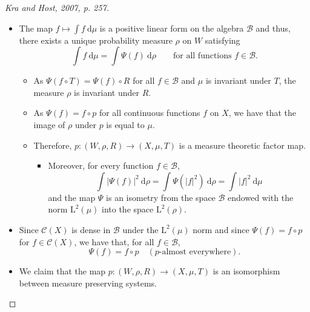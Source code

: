 \documentclass[
  british,
]{article}
\providecommand{\tightlist}{%
  \setlength{\itemsep}{0pt}\setlength{\parskip}{0pt}}
\theoremstyle{plain}
\theoremstyle{definition}
\theoremstyle{plain}
\theoremstyle{remark}
\newcommand{\Measure}{{\mu}}
\begin{document}
\begin{proof}[{Kra and Host, 2007, p. 257}]
\begin{itemize}
  \begin{itemize}
  \tightlist
  \item
    Similarly, the map \(g\mapsto g\circ\pi\) from \(\mathcal{C}(Y)\) to
    \(\mathcal{B}\) is an isometric homomorphism of algebras and thus
    induces a continuous surjective map \(q:W\rightarrow Y\) satisfying
    \(g\circ q=\Psi(g\circ\pi)\) for all continuous functions \(g\) on
    \(Y\).
  \item
    We have that \(S\circ q=q\circ R\) so \(p:(W,R)\rightarrow(X,T)\)
    and \(q:(W,R)\rightarrow(Y,S)\) are factor maps, in the topological
    sense.
  \end{itemize}
\item
  The map \(f\mapsto\int f\ \mathrm{d}\Measure\) is a positive linear
  form on the algebra \(\mathcal{B}\) and thus, there exists a unique
  probability measure \(\rho\) on \(W\) satisfying
  \[\int f\ \mathrm{d}\Measure=\int\Psi(f)\ \mathrm{d}\rho\qquad\text{for all functions }f\in\mathcal{B}. \]

  \begin{itemize}
  \tightlist
  \item
    As \(\Psi(f\circ T)=\Psi(f)\circ R\) for all \(f\in\mathcal{B}\) and
    \(\mu\) is invariant under \(T\), the measure \(\rho\) is invariant
    under \(R\).
  \item
    As \(\Psi(f)=f\circ p\) for all continuous functions \(f\) on \(X\),
    we have that the image of \(\rho\) under \(p\) is equal to \(\mu\).
  \item
    Therefore, \(p:(W,\rho,R)\rightarrow(X,\mu,T)\) is a measure
    theoretic factor map.

    \begin{itemize}
    \tightlist
    \item
      Moreover, for every function \(f\in\mathcal{B}\),
      \[\int|\Psi(f)|^2\ \mathrm{d}\rho=\int\Psi(|f|^2)\ \mathrm{d}\rho=\int|f|^2\ \mathrm{d}\mu \]
      and the map \(\Psi\) is an isometry from the space \(\mathcal{B}\)
      endowed with the norm \(\text{L}^2(\mu)\) into the space
      \(\text{L}^2(\rho)\).
    \end{itemize}
  \end{itemize}
\item
  Since \(\mathcal{C}(X)\) is dense in \(\mathcal{B}\) under the
  \(\text{L}^2(\mu)\) norm and since \(\Psi(f)=f\circ p\) for
  \(f\in\mathcal{C}(X)\), we have that, for all \(f\in\mathcal{B}\),
  \[\Psi(f)=f\circ p\quad(p\text{-almost everywhere}). \]
\item
  We claim that the map \(p:(W,\rho,R)\rightarrow(X,\mu,T)\) is an
  isomorphism between measure preserving systems.


\end{itemize}
\end{proof}
\end{document}

